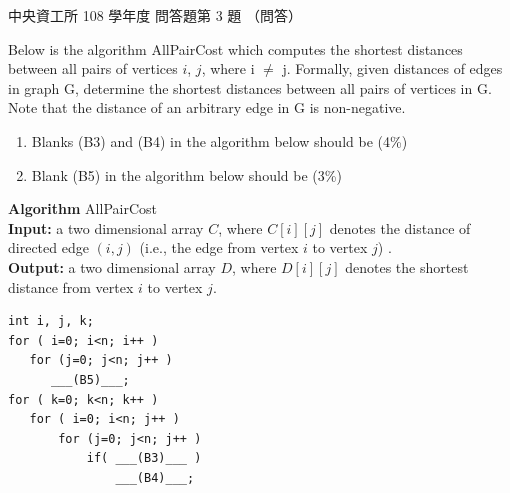 \begin{pastexam}[label={px:ncu-108-dsa-15}]{中央資工所 108 學年度 問答題第 3 題}
（問答）

Below is the algorithm AllPairCost which computes the shortest distances between all pairs of
vertices $i$, $j$, where i $\neq$ j. Formally, given distances of edges in graph G, determine the
shortest distances between all pairs of vertices in G. Note that the distance of an arbitrary edge
in G is non-negative.
\begin{enumerate}[label=(\alph*)]
\item Blanks (B3) and (B4) in the algorithm below should be \underline{\hspace{3em}}(4\%)
\item Blank (B5) in the algorithm below should be \underline{\hspace{3em}}(3\%)
\end{enumerate}

\textbf{Algorithm} AllPairCost\\
\textbf{Input:} a two dimensional array $C$, where $C[i][j]$ denotes the distance of directed edge
$(i, j)$ (i.e., the edge from vertex $i$ to vertex $j$) .\\
\textbf{Output:} a two dimensional array $D$, where $D[i][j]$ denotes the shortest distance from
vertex $i$ to vertex $j$.
\begin{verbatim}
int i, j, k;
for ( i=0; i<n; i++ )
   for (j=0; j<n; j++ )
      ___(B5)___;
for ( k=0; k<n; k++ )
   for ( i=0; i<n; j++ )
       for (j=0; j<n; j++ )
           if( ___(B3)___ )
               ___(B4)___;
\end{verbatim}
\end{pastexam}

